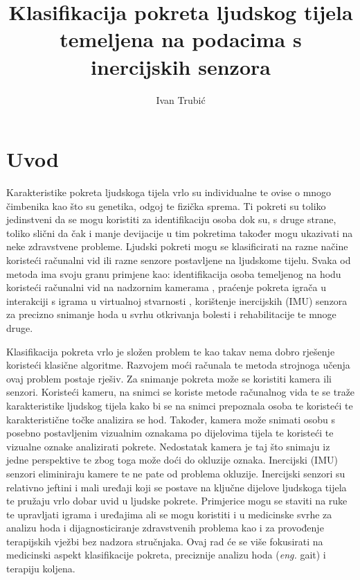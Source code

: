 \documentclass[times, utf8, diplomski]{fer}
\begin{document}

\title{Klasifikacija pokreta ljudskog tijela temeljena na podacima s inercijskih senzora}

\author{Ivan Trubić}

\maketitle


\zahvala{}

\tableofcontents

\chapter{Uvod}
Karakteristike pokreta ljudskoga tijela vrlo su individualne te ovise o mnogo čimbenika kao što su genetika, odgoj te
fizička sprema. Ti pokreti su toliko jedinstveni da se mogu koristiti za identifikaciju osoba dok su, s druge strane,
toliko slični da čak i manje devijacije u tim pokretima također mogu ukazivati na neke zdravstvene probleme.
Ljudski pokreti mogu se klasificirati na razne načine koristeći računalni vid ili razne senzore postavljene na
ljudskome tijelu. Svaka od metoda ima svoju granu primjene kao: identifikacija osoba temeljenog na hodu koristeći
računalni vid na nadzornim kamerama \citep{surveillance}, praćenje pokreta igrača u interakciji s igrama u virtualnoj stvarnosti \citep{VR},
korištenje inercijskih (IMU) senzora za precizno snimanje hoda u svrhu otkrivanja bolesti i rehabilitacije te mnoge druge.

Klasifikacija pokreta vrlo je složen problem te kao takav nema dobro rješenje koristeći klasične algoritme. Razvojem moći računala
te metoda strojnoga učenja ovaj problem postaje rješiv. Za snimanje pokreta može se koristiti kamera ili senzori.
Koristeći kameru, na snimci se koriste metode računalnog vida te se traže karakteristike ljudskog tijela kako bi se na snimci
prepoznala osoba te koristeći te karakteristične točke analizira se hod. Također, kamera može snimati osobu s posebno postavljenim
vizualnim oznakama po dijelovima tijela te koristeći te vizualne oznake analizirati pokrete. Nedostatak kamera je taj što snimaju iz
jedne perspektive te zbog toga može doći do okluzije oznaka. Inercijski (IMU) senzori eliminiraju kamere te ne pate od problema okluzije.
Inercijski senzori su relativno jeftini i mali uređaji koji se postave na ključne dijelove ljudskoga tijela te pružaju vrlo dobar uvid
u ljudske pokrete. Primjerice mogu se staviti na ruke te upravljati igrama i uređajima ali se mogu koristiti i u medicinske svrhe za
analizu hoda i dijagnosticiranje zdravstvenih problema kao i za provođenje terapijskih vježbi bez nadzora stručnjaka.
Ovaj rad će se više fokusirati na medicinski aspekt klasifikacije pokreta, preciznije analizu hoda (\textit{eng.} gait) i terapiju koljena.
\end{document}
